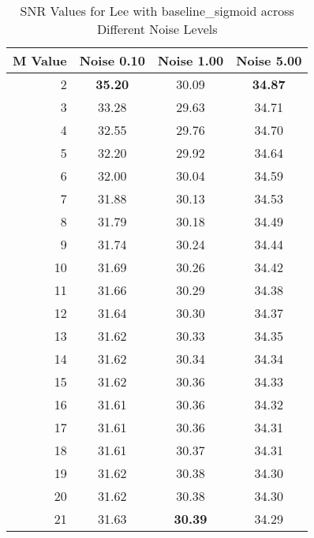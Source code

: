     \begin{table}[htb]
       \small

    \centering 
    \begin{tabular}{|r|ccc|}\hline
   M Value &  Noise 0.10 &  Noise 1.00 &  Noise 5.00 \\ \hline 
      2 &  \textbf{35.20} &  30.09 &  \textbf{34.87}  \\ \hline 
      3 &  33.28 &  29.63 &  34.71  \\ \hline 
      4 &  32.55 &  29.76 &  34.70  \\ \hline 
      5 &  32.20 &  29.92 &  34.64  \\ \hline 
      6 &  32.00 &  30.04 &  34.59  \\ \hline 
      7 &  31.88 &  30.13 &  34.53  \\ \hline 
      8 &  31.79 &  30.18 &  34.49  \\ \hline 
      9 &  31.74 &  30.24 &  34.44  \\ \hline 
      10 &  31.69 &  30.26 &  34.42  \\ \hline 
      11 &  31.66 &  30.29 &  34.38  \\ \hline 
      12 &  31.64 &  30.30 &  34.37  \\ \hline 
      13 &  31.62 &  30.33 &  34.35  \\ \hline 
      14 &  31.62 &  30.34 &  34.34  \\ \hline 
      15 &  31.62 &  30.36 &  34.33  \\ \hline 
      16 &  31.61 &  30.36 &  34.32  \\ \hline 
      17 &  31.61 &  30.36 &  34.31  \\ \hline 
      18 &  31.61 &  30.37 &  34.31  \\ \hline 
      19 &  31.62 &  30.38 &  34.30  \\ \hline 
      20 &  31.62 &  30.38 &  34.30  \\ \hline 
      21 &  31.63 &  \textbf{30.39} &  34.29  \\ \hline 
    \end{tabular}
    \caption{SNR Values for Lee with baseline_sigmoid across Different Noise Levels}
    \end{table}


